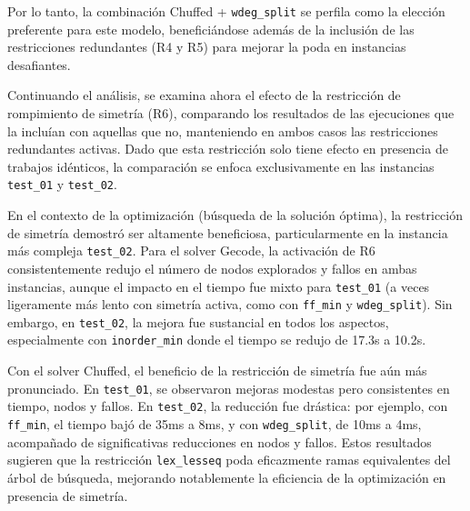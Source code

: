 Por lo tanto, la combinación Chuffed + \texttt{wdeg\_split} se perfila como la elección preferente para este modelo, beneficiándose además de la inclusión de las restricciones redundantes (R4 y R5) para mejorar la poda en instancias desafiantes.

Continuando el análisis, se examina ahora el efecto de la restricción de rompimiento de simetría (R6), comparando los resultados de las ejecuciones que la incluían con aquellas que no, manteniendo en ambos casos las restricciones redundantes activas. Dado que esta restricción solo tiene efecto en presencia de trabajos idénticos, la comparación se enfoca exclusivamente en las instancias \texttt{test\_01} y \texttt{test\_02}.

En el contexto de la optimización (búsqueda de la solución óptima), la restricción de simetría demostró ser altamente beneficiosa, particularmente en la instancia más compleja \texttt{test\_02}. Para el solver Gecode, la activación de R6 consistentemente redujo el número de nodos explorados y fallos en ambas instancias, aunque el impacto en el tiempo fue mixto para \texttt{test\_01} (a veces ligeramente más lento con simetría activa, como con \texttt{ff\_min} y \texttt{wdeg\_split}). Sin embargo, en \texttt{test\_02}, la mejora fue sustancial en todos los aspectos, especialmente con \texttt{inorder\_min} donde el tiempo se redujo de 17.3s a 10.2s.

Con el solver Chuffed, el beneficio de la restricción de simetría fue aún más pronunciado. En \texttt{test\_01}, se observaron mejoras modestas pero consistentes en tiempo, nodos y fallos. En \texttt{test\_02}, la reducción fue drástica: por ejemplo, con \texttt{ff\_min}, el tiempo bajó de 35ms a 8ms, y con \texttt{wdeg\_split}, de 10ms a 4ms, acompañado de significativas reducciones en nodos y fallos. Estos resultados sugieren que la restricción \texttt{lex\_lesseq} poda eficazmente ramas equivalentes del árbol de búsqueda, mejorando notablemente la eficiencia de la optimización en presencia de simetría.

